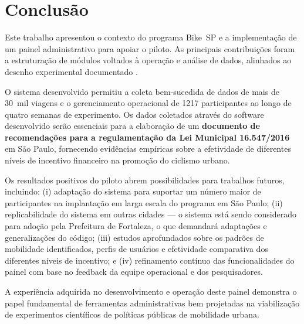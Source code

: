 
\chapter{Conclusão}
\label{cap:conclusao}

Este trabalho apresentou o contexto do programa Bike~SP e a implementação de um
painel administrativo para apoiar o piloto. As principais contribuições foram a
estruturação de módulos voltados à operação e análise de dados, alinhados ao
desenho experimental documentado \citep{faria2023:bikespCaseStudy}.

O sistema desenvolvido permitiu a coleta bem-sucedida de dados de mais de 30~mil
viagens e o gerenciamento operacional de 1217 participantes ao longo de quatro
semanas de experimento. Os dados coletados através do software desenvolvido
serão essenciais para a elaboração de um \textbf{documento de recomendações para
a regulamentação da Lei Municipal 16.547/2016} em São Paulo, fornecendo
evidências empíricas sobre a efetividade de diferentes níveis de incentivo
financeiro na promoção do ciclismo urbano.

Os resultados positivos do piloto abrem possibilidades para trabalhos futuros,
incluindo: (i) adaptação do sistema para suportar um número maior de
participantes na implantação em larga escala do programa em São Paulo; (ii)
replicabilidade do sistema em outras cidades --- o sistema está sendo
considerado para adoção pela Prefeitura de Fortaleza, o que demandará adaptações
e generalizações do código; (iii) estudos aprofundados sobre os padrões de
mobilidade identificados, perfis de usuários e efetividade comparativa dos
diferentes níveis de incentivo; e (iv) refinamento contínuo das funcionalidades
do painel com base no feedback da equipe operacional e dos pesquisadores.

A experiência adquirida no desenvolvimento e operação deste painel demonstra o
papel fundamental de ferramentas administrativas bem projetadas na viabilização
de experimentos científicos de políticas públicas de mobilidade urbana.


